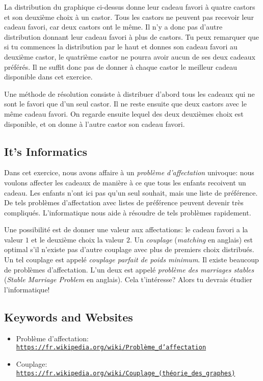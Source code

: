 \documentclass[a4paper,11pt]{report}
\newcommand{\BrochureUrlText}[1]{\texttt{#1}}
\begin{document}
La distribution du graphique ci-dessus donne leur cadeau favori à quatre castors et son deuxième choix à un castor. Tous les castors ne peuvent pas recevoir leur cadeau favori, car deux castors ont le même. Il n’y a donc pas d’autre distribution donnant leur cadeau favori à plus de castors. Tu peux remarquer que si tu commences la distribution par le haut et donnes son cadeau favori au deuxième castor, le quatrième castor ne pourra avoir aucun de ses deux cadeaux préférés. Il ne suffit donc pas de donner à chaque castor le meilleur cadeau disponible dans cet exercice.

Une méthode de résolution consiste à distribuer d’abord tous les cadeaux qui ne sont le favori que d’un seul castor. Il ne reste ensuite que deux castors avec le même cadeau favori. On regarde ensuite lequel des deux deuxièmes choix est disponible, et on donne à l’autre castor son cadeau favori.


\subsection*{It’s Informatics}

Dans cet exercice, nous avons affaire à un \emph{problème d’affectation} univoque: nous voulons affecter les cadeaux de manière à ce que tous les enfants recoivent un cadeau. Les enfants n’ont ici pas qu’un seul souhait, mais une liste de préférence. De tels problèmes d’affectation avec listes de préférence peuvent devenir très compliqués. L’informatique nous aide à résoudre de tels problèmes rapidement.

Une possibilité est de donner une valeur aux affectations: le cadeau favori a la valeur $1$ et le deuxième choix la valeur $2$. Un \emph{couplage} (\emph{matching} en anglais) est optimal s’il n’existe pas d’autre couplage avec plus de premiers choix distribués. Un tel couplage est appelé \emph{couplage parfait de poids minimum}. Il existe beaucoup de problèmes d’affectation. L’un deux est appelé \emph{problème des marriages stables} (\emph{Stable Marriage Problem} en anglais). Cela t’intéresse? Alors tu devrais étudier l’informatique!

{\raggedright

\subsection*{Keywords and Websites}

\begin{itemize}
  \item Problème d’affectation: \href{https://fr.wikipedia.org/wiki/Probl\%C3\%A8me_d\%27affectation}{\BrochureUrlText{https://fr.wikipedia.org/wiki/Problème\_d’affectation}}
  \item Couplage: \href{https://fr.wikipedia.org/wiki/Couplage_(th\%C3\%A9orie_des_graphes)}{\BrochureUrlText{https://fr.wikipedia.org/wiki/Couplage\_(théorie\_des\_graphes)}}
\end{itemize}


}
\end{document}
